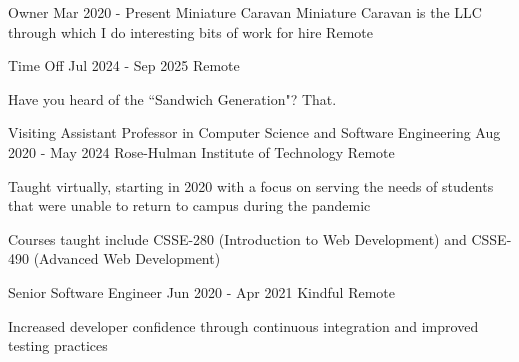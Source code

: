 

\begin{cventries}

  \cventrywithorganizationnote
  {Owner}
  {Mar 2020 - Present}
  {Miniature Caravan}
  {Miniature Caravan is the LLC through which I do interesting bits of work for hire}
  {Remote}
  {
    \cvtags{
      \tagRuby
      \tagRails
      \tagHAML
      \tagSASS
      \tagAirtable
      \tagPostgreSQL
      \tagTDDShort
      \tagProjectManagement
    }
  }

  \cventrywithorganizationnote
  {Time Off}
  {Jul 2024 - Sep 2025}
  {}
  {} %
  {Remote}
  {
    \begin{cvitems}
      \item Have you heard of the ``Sandwich Generation"? That.
    \end{cvitems}
    \cvtags{
      \tagAirtable
      \tagProjectManagement
      \tagTeaching
    }
  }

  \cventry
  {Visiting Assistant Professor in Computer Science and Software Engineering}
  {Aug 2020 - May 2024}
  {Rose-Hulman Institute of Technology}
  {Remote}
  {
    \begin{cvitems}
      \item Taught virtually, starting in 2020 with a focus on serving the needs of students that were unable to return to campus during the pandemic
      \item Courses taught include CSSE-280 (Introduction to Web Development) and CSSE-490 (Advanced Web Development)
    \end{cvitems}
    \cvtags{
      \tagCSS
      \tagHTML
      \tagJavaScript
      \tagPython
      \tagSASS
      \tagFlask
      \tagReact
      \tagAirtable
      \tagSQLite
      \tagFigma
      \tagTeaching
      \tagTDDShort
    }
  }

  \cventry
  {Senior Software Engineer}
  {Jun 2020 - Apr 2021}
  {Kindful}
  {Remote}
  {
    \begin{cvitems}
      \item Increased developer confidence through continuous integration and improved testing practices
    \end{cvitems}
    \cvtags{
      \tagRuby
      \tagRails
      \tagPostgreSQL
      \tagCIShort
      \tagTDDShort
    }
  }


\end{cventries}
